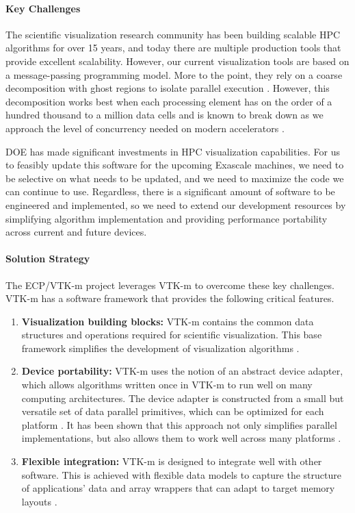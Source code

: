 \paragraph{Key  Challenges}
The scientific visualization research community has been building scalable HPC algorithms for over 15 years, and today there are multiple production tools that provide excellent scalability.
However, our current visualization tools are based on a message-passing programming model.
More to the point, they rely on a coarse decomposition with ghost regions to isolate parallel execution \cite{Ahrens2001,Childs2010}.
However, this decomposition works best when each processing element has on the order of a hundred thousand to a million data cells \cite{ParaViewTutorial} and is known to break down as we approach the level of concurrency needed on modern accelerators \cite{Moreland2012:Ultravis,Moreland2013:UltraVis}.

DOE has made significant investments in HPC visualization capabilities.
For us to feasibly update this software for the upcoming Exascale machines, we need to be selective on what needs to be updated, and we need to maximize the code we can continue to use.
Regardless, there is a significant amount of software to be engineered and implemented, so we need to extend our development resources by simplifying algorithm implementation and providing performance portability across current and future devices.


\paragraph{Solution Strategy}
The ECP/VTK-m project leverages VTK-m \cite{Moreland2016:VTKm} to overcome these key challenges.
VTK-m has a software framework that provides the following critical features.

\begin{enumerate}
\item \textbf{Visualization building blocks:}
  VTK-m contains the common data structures and operations required for scientific visualization.
  This base framework simplifies the development of visualization algorithms \cite{VTKmUsersGuide}.
\item \textbf{Device portability:}
  VTK-m uses the notion of an abstract device adapter, which allows algorithms written once in VTK-m to run well on many computing architectures.
  The device adapter is constructed from a small but versatile set of data parallel primitives, which can be optimized for each platform \cite{Blelloch1990}.
  It has been shown that this approach not only simplifies parallel implementations, but also allows them to work well across many platforms \cite{Lo2012,Larsen2015,Moreland2015}.
\item \textbf{Flexible integration:}
  VTK-m is designed to integrate well with other software.
  This is achieved with flexible data models to capture the structure of applications' data \cite{Meredith2012} and array wrappers that can adapt to target memory layouts \cite{Moreland2012:PDAC}.
\end{enumerate}

